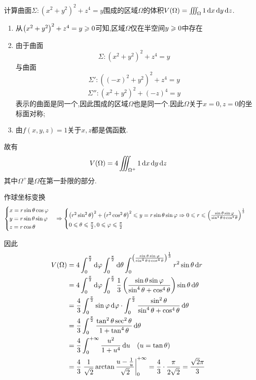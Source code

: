 \begin{example}
    计算曲面$\Sigma:\left( x^2 + y^2 \right)^2 + z^4 = y$围成的区域$\Omega$的体积$V(\Omega) = \iiint_\Omega 1 \operatorname{d\!} x \operatorname{d\!} y \operatorname{d\!} z$.
\end{example}

\begin{solution}

\begin{enumerate}
    \item 
从$\left( x^2 + y^2 \right)^2 + z^4 = y \geqslant 0$可知,区域$\Omega$仅在半空间$y \geqslant 0$中存在
\item 由于曲面
$$\Sigma: \left( x^2 + y^2 \right)^2 + z^4 = y$$
与曲面
$$\Sigma': \left( (-x)^2 + y^2 \right)^2 + z^4 = y$$
$$\Sigma'': \left( x^2 + y^2 \right)^2 + (-z)^4 = y$$
表示的曲面是同一个,因此围成的区域$\Omega$也是同一个.因此$\Omega$关于$x=0,z=0$的坐标面对称;
\item 由$f(x,y,z) = 1$关于$x,z$都是偶函数.
\end{enumerate}
故有$$V(\Omega) = 4 \iiint_{\Omega^+} 1 \operatorname{d\!} x \operatorname{d\!} y \operatorname{d\!} z$$
其中$\Omega^+$是$\Omega$在第一卦限的部分.

作球坐标变换
$$\begin{cases}
    x = r \sin \theta \cos \varphi\\
    y = r \sin \theta \sin \varphi\\
    z = r \cos \theta
\end{cases} \Rightarrow \begin{cases}
    \left( r^2 \sin^2 \theta \right)^2 + \left( r^2 \cos^2 \theta \right)^2 \leqslant y = r \sin \theta \sin \varphi \Rightarrow 0 \leqslant r \leqslant \left( \frac{\sin \theta \sin \varphi}{\sin^4 \theta + \cos^4 \theta} \right)^\frac{1}{3} \\
    0 \leqslant \theta \leqslant \frac{\pi}{2}, 0 \leqslant \varphi \leqslant \frac{\pi}{2}
\end{cases}$$

因此\begin{align*}
    V(\Omega) &= 4 \int_0^{\frac{\pi}{2}} \dif \varphi \int_0^{\frac{\pi}{2}} \dif \theta \int_0^{\left( \frac{\sin \theta \sin \varphi}{\sin^4 \theta + \cos^4 \theta} \right)^\frac{1}{3}} r^2 \sin \theta \dif r\\
    &= 4 \int_0^{\frac{\pi}{2}} \dif \varphi \int_0^{\frac{\pi}{2}} \frac13 \left( \frac{\sin \theta \sin \varphi}{\sin^4 \theta + \cos^4 \theta} \right) \sin \theta \dif \theta\\
    &=\frac{4}{3} \int_0^{\frac{\pi}{2}}  \sin \varphi \dif \varphi \cdot \int_0^{\frac{\pi}{2}} \frac{\sin^2 \theta}{\sin^4 \theta + \cos^4 \theta} \dif \theta\\
    &= \frac{4}{3} \int_0^{\frac{\pi}{2}}  \frac{\tan^2 \theta \sec^2 \theta}{1 + \tan^4 \theta} \dif \theta\\
    &= \frac{4}{3} \int_0^{+\infty} \frac{u^2}{1 + u^4} \dif u \quad (u = \tan \theta) \\
    &=\frac{4}{3}\left. \frac{1}{\sqrt 2} \arctan \frac{u - \frac1u}{\sqrt 2} \right|_0^{+\infty} = \frac{4}{3} \cdot \frac{\pi}{2\sqrt 2} = \frac{\sqrt 2 \pi}{3}
\end{align*}




\end{solution}

